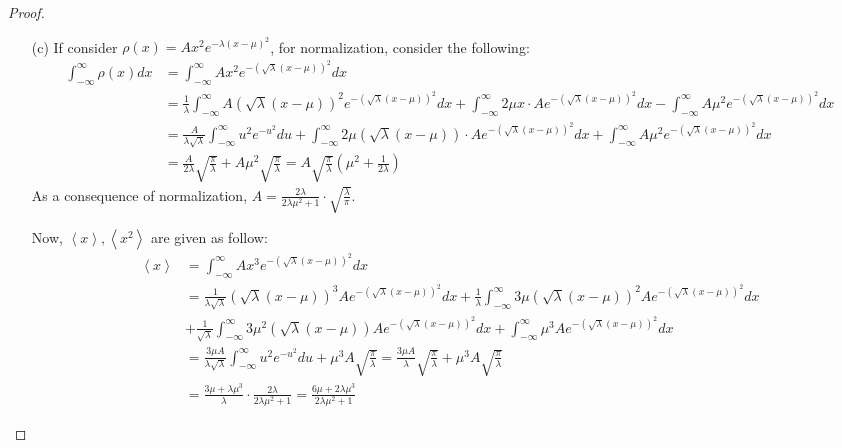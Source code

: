 \documentclass{article}
\begin{document}
\begin{proof}
\begin{itemize}
        \item[(c)] If consider $\rho(x)=Ax^2e^{-\lambda(x-\mu)^2}$, for normalization, consider the following:
        \begin{align}
            \int_{-\infty}^{\infty}\rho(x)dx &= \int_{-\infty}^{\infty}Ax^2e^{-(\sqrt{\lambda}(x-\mu))^2}dx\\&= \frac{1}{\lambda}\int_{-\infty}^{\infty}A(\sqrt{\lambda}(x-\mu))^2e^{-(\sqrt{\lambda}(x-\mu))^2}dx + \int_{-\infty}^{\infty}2\mu x\cdot Ae^{-(\sqrt{\lambda}(x-\mu))^2}dx-\int_{-\infty}^{\infty}A\mu^2e^{-(\sqrt{\lambda}(x-\mu))^2}dx\\
            &= \frac{A}{\lambda\sqrt{\lambda}}\int_{-\infty}^{\infty}u^2e^{-u^2}du + \int_{-\infty}^{\infty}2\mu(\sqrt{\lambda}(x-\mu))\cdot Ae^{-(\sqrt{\lambda}(x-\mu))^2}dx+\int_{-\infty}^{\infty}A\mu^2e^{-(\sqrt{\lambda}(x-\mu))^2}dx\\
            &= \frac{A}{2\lambda}\sqrt{\frac{\pi}{\lambda}}+A\mu^2\sqrt{\frac{\pi}{\lambda}} = A\sqrt{\frac{\pi}{\lambda}}\left(\mu^2+\frac{1}{2\lambda}\right)
        \end{align}
        As a consequence of normalization, $A=\frac{2\lambda}{2\lambda\mu^2+1}\cdot\sqrt{\frac{\lambda}{\pi}}$.

        \hfil

        Now, $\left<x\right>,\left<x^2\right>$ are given as follow:
        \begin{align}
            \left<x\right>&=\int_{-\infty}^{\infty}Ax^3e^{-(\sqrt{\lambda}(x-\mu))^2}dx\\
            &= \frac{1}{\lambda\sqrt{\lambda}}(\sqrt{\lambda}(x-\mu))^3 Ae^{-(\sqrt{\lambda}(x-\mu))^2}dx + \frac{1}{\lambda}\int_{-\infty}^{\infty}3\mu(\sqrt{\lambda}(x-\mu))^2 Ae^{-(\sqrt{\lambda}(x-\mu))^2}dx\\
            &+ \frac{1}{\sqrt{\lambda}}\int_{-\infty}^{\infty}3\mu^2(\sqrt{\lambda}(x-\mu))Ae^{-(\sqrt{\lambda}(x-\mu))^2}dx + \int_{-\infty}^{\infty}\mu^3 Ae^{-(\sqrt{\lambda}(x-\mu))^2}dx\\
            &= \frac{3\mu A}{\lambda\sqrt{\lambda}}\int_{-\infty}^{\infty}u^2e^{-u^2}du + \mu^3 A\sqrt{\frac{\pi}{\lambda}} = \frac{3\mu A}{\lambda}\sqrt{\frac{\pi}{\lambda}}+\mu^3 A\sqrt{\frac{\pi}{\lambda}}\\
            &= \frac{3\mu+\lambda\mu^3}{\lambda}\cdot \frac{2\lambda}{2\lambda\mu^2+1} = \frac{6\mu+2\lambda\mu^3}{2\lambda\mu^2+1}
        \end{align}

        \hfil


\end{itemize}
\end{proof}
\end{document}
